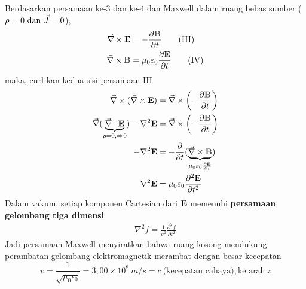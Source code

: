Berdasarkan persamaan ke-3 dan ke-4 dan Maxwell dalam ruang bebas sumber ($\rho=0 \text{ dan } \vec{J}=0$), 
\begin{align*}
    \Curl \vE &= -\frac{\partial \vB}{\partial t}\tag{III}\\
    \Curl \vB &= \mu_0\epsilon_0\frac{\partial \vE}{\partial t}\tag{IV}
\end{align*}
maka, curl-kan kedua sisi persamaan-III
\begin{align*}
    \Curl (\Curl \vE) &= \Curl \left(-\frac{\partial \vB}{\partial t}\right)\\
    \vnabla(\underbrace{\Div \vE}_{\substack{\rho=0, \Rightarrow 0}})-\nabla^2 \vE&=\Curl \left(-\frac{\partial \vB}{\partial t}\right)\\
    -\nabla^2 \vE&=-\frac{\partial}{\partial t} (\underbrace{\Curl \vB}_{\substack{\mu_0\epsilon_0\frac{\partial \vE}{\partial t}}})\\
    \nabla^2 \vE&=\mu_0\epsilon_0 \frac{\partial^2 \vE}{\partial t^2}
\end{align*}
Dalam vakum, setiap komponen Cartesian dari $\vE$ memenuhi \textbf{persamaan gelombang tiga dimensi}
\begin{align*}
    \nabla^2 f = \frac{1}{v^2}\frac{\partial^2 f}{\partial t^2}
\end{align*}
Jadi persamaan Maxwell menyiratkan bahwa ruang kosong mendukung perambatan gelombang elektromagnetik merambat dengan besar kecepatan 
\begin{equation*}
    v=\frac{1}{\sqrt{\mu_0\epsilon_0}}=3,00\times 10^8\ \si{m/s} = c\ \text{(kecepatan cahaya)}, \text{ke arah}\  z
\end{equation*}
